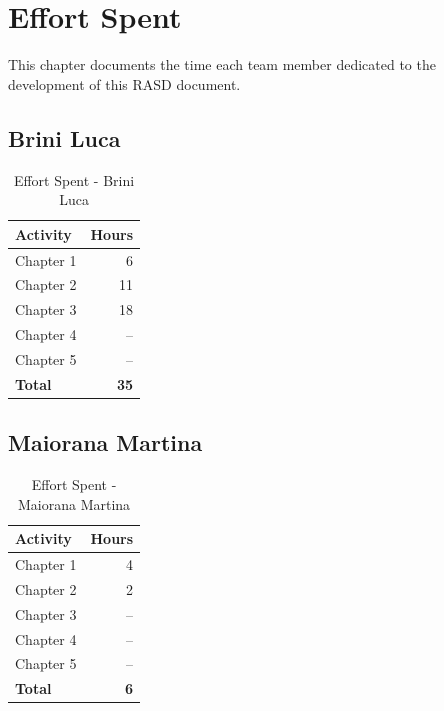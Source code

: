 \chapter{Effort Spent}
\label{ch:effort}

This chapter documents the time each team member dedicated to the development of this RASD document.

\section{Brini Luca}
\begin{table}[H]
\centering
\begin{tabular}{|l|r|}
\hline
\textbf{Activity} & \textbf{Hours} \\ \hline
Chapter 1 & 6 \\ \hline
Chapter 2 & 11  \\ \hline
Chapter 3 & 18 \\ \hline
Chapter 4 & -- \\ \hline
Chapter 5 & -- \\ \hline
\textbf{Total} & \textbf{35} \\ \hline
\end{tabular}
\caption{Effort Spent - Brini Luca}
\end{table}

\section{Maiorana Martina}
\begin{table}[H]
\centering
\begin{tabular}{|l|r|}
\hline
\textbf{Activity} & \textbf{Hours} \\ \hline
Chapter 1 & 4 \\ \hline
Chapter 2 & 2 \\ \hline
Chapter 3 & -- \\ \hline
Chapter 4 & -- \\ \hline
Chapter 5 & -- \\ \hline
\textbf{Total} & \textbf{6} \\ \hline
\end{tabular}
\caption{Effort Spent - Maiorana Martina}
\end{table}

